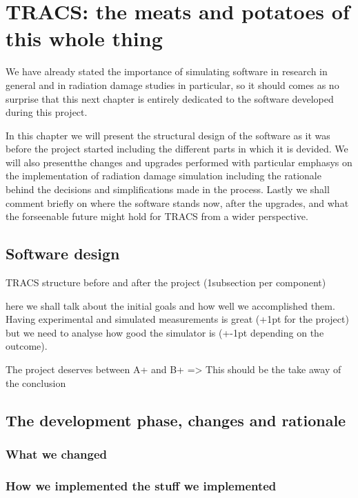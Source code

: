 \chapter{TRACS: the meats and potatoes of this whole thing}
\label{chap:Comp}

We have already stated the importance of simulating software in research in general and in radiation damage studies in particular, so it should comes as no surprise that this next chapter is entirely dedicated to the software developed during this project.

In this chapter we will present the structural design of the software as it was before the project started including the different parts in which it is devided. We will also presentthe changes and upgrades performed with particular emphasys on the implementation of radiation damage simulation including the rationale behind the decisions and simplifications made in the process. Lastly we shall comment briefly on where the software stands now, after the upgrades, and what the forseenable future might hold for TRACS from a wider perspective.

\section{Software design} %
\label{sec:results_and_achievements}

TRACS structure before and after the project (1subsection per component)

here we shall talk about the initial goals and how well we accomplished them. Having experimental and simulated measurements is great (+1pt for the project) but we need to analyse how good the simulator is (+-1pt depending on the outcome).

The project deserves between A+ and B+ => This should be the take away of the conclusion


\section{The development phase, changes and rationale} %
\label{sec:let_s_put_the_project_in_perspective}

\subsection{What we changed}

\subsection{How we implemented the stuff we implemented}

